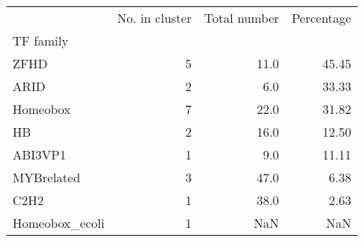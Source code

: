 \begin{tabular}{lrrr}
\toprule
{} &  No. in cluster &  Total number &  Percentage \\
TF family      &                 &               &             \\
\midrule
ZFHD           &               5 &          11.0 &       45.45 \\
ARID           &               2 &           6.0 &       33.33 \\
Homeobox       &               7 &          22.0 &       31.82 \\
HB             &               2 &          16.0 &       12.50 \\
ABI3VP1        &               1 &           9.0 &       11.11 \\
MYBrelated     &               3 &          47.0 &        6.38 \\
C2H2           &               1 &          38.0 &        2.63 \\
Homeobox\_ecoli &               1 &           NaN &         NaN \\
\bottomrule
\end{tabular}

